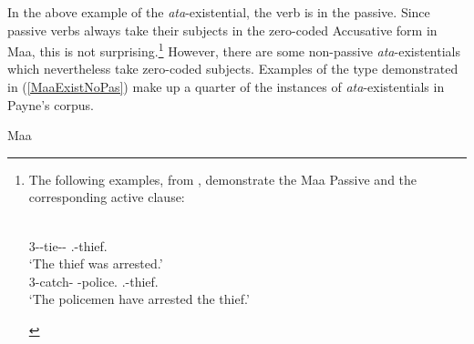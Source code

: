 In the above example of the \emph{ata}-existential, the verb is in the passive. 
Since passive verbs always take their subjects in the zero-coded Accusative form in Maa, this is not surprising.\footnote{The following examples, from \citet[ex.16, ex.15]{Payne:2007}, demonstrate the Maa Passive and the corresponding active clause: 
\begin{exe}\ex
\begin{xlist}\ex\gll{} \textbf{}\\
3-\prf{}-tie-\prf{}-\pass{} \mas{}.\sg{}-thief.\acc{}\\
\glt `The thief was arrested.'
\ex\gll{} 	\textbf{}\\
3-catch-\prf{} \pl{}-police.\nom{} \mas{}.\sg{}-thief.\acc{}\\
\glt `The policemen have arrested the thief.'
\end{xlist}
\end{exe}}
However, there are some non-passive \emph{ata}-existentials which nevertheless take zero-coded subjects. 
Examples of the type demonstrated in (\ref{MaaExistNoPas}) make up a quarter of the instances of \emph{ata}-existentials in Payne's corpus. 

\begin{exe}\ex\label{MaaExistNoPas} {Maa} \citep{Payne:2007}\nopagebreak[4]
\end{exe}

